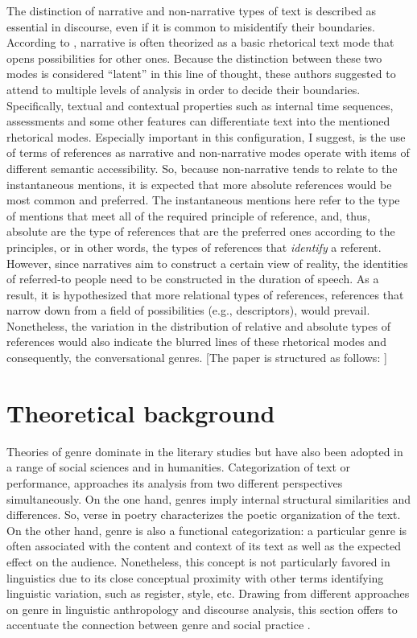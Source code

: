 \documentclass[12pt, draft]{article}
\begin{document}
The distinction of narrative and non-narrative types of text is described as essential in discourse, even if it is common to misidentify their boundaries. According to \textcite{georgakopoulou2000}, narrative is often theorized as a basic rhetorical text mode that opens possibilities for other ones. Because the distinction between these two modes is considered ``latent'' in this line of thought, these authors suggested to attend to multiple levels of analysis in order to decide their boundaries. Specifically, textual and contextual properties such as internal time sequences, assessments and some other features can differentiate text into the mentioned rhetorical modes. Especially important in this configuration, I suggest, is the use of terms of references as narrative and non-narrative modes operate with items of different semantic accessibility. So, because non-narrative tends to relate to the instantaneous mentions, it is expected that more absolute references would be most common and preferred. The instantaneous mentions here refer to the type of mentions that meet all of the required principle of reference, and, thus, absolute are the type of references that are the preferred ones according to the principles, or in other words, the types of references that \textit{identify} a referent. However, since narratives aim to construct a certain view of reality, the identities of referred-to people need to be constructed in the duration of speech. As a result, it is hypothesized that more relational types of references, references that narrow down from a field of possibilities (e.g., descriptors), would prevail. Nonetheless, the variation in the distribution of relative and absolute types of references would also indicate the blurred lines of these rhetorical modes and consequently, the conversational genres.  
[The paper is structured as follows: ]
\section{Theoretical background}
Theories of genre dominate in the literary studies but have also been adopted in a range of social sciences and in humanities. Categorization of text or performance, approaches its analysis from two different perspectives simultaneously. On the one hand, genres imply internal structural similarities and differences. So, verse in poetry characterizes the poetic organization of the text. On the other hand, genre is also a functional categorization: a particular genre is often associated with the content and context of its text as well as the expected effect on the audience. Nonetheless, this concept is not particularly favored in linguistics due to its close conceptual proximity with other terms identifying linguistic variation, such as register, style, etc. Drawing from different approaches on genre in linguistic anthropology and discourse analysis, this section offers to accentuate the connection between genre and social practice \parencite{hanks1987}.  
\end{document}
